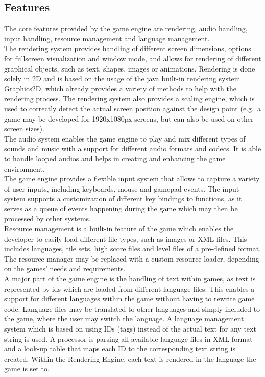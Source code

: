 \subsection{Features}\label{subsec:features}
The core features provided by the game engine are rendering, audio handling, input handling, resource management and language management.
\\
The rendering system provides handling of different screen dimensions, options for fullscreen visualization and window mode, and allows
for rendering of different graphical objects, such as text, shapes, images or animations.
Rendering is done solely in 2D and is based on the usage of the java built-in rendering system Graphics2D, which already provides a
variety of methods to help with the rendering process.
The rendering system also provides a scaling engine, which is used to correctly detect the actual screen position against the design point (e.g.\ a
game may be developed for 1920x1080px screens, but can also be used on other screen sizes).
\\
The audio system enables the game engine to play and mix different types of sounds and music with a support for different audio formats and codecs.
It is able to handle looped audios and helps in creating and enhancing the game environment.
\\
The game engine provides a flexible input system that allows to capture a variety of user inputs, including keyboards, mouse and gamepad events.
The input system supports a customization of different key bindings to functions, as it serves as a queue of events happening during the game which
may then be processed by other systems.
\\
Resource management is a built-in feature of the game which enables the developer to easily load different file types, such as images or XML files.
This includes languages, tile sets, high score files and level files of a pre-defined format.
The resource manager may be replaced with a custom resource loader, depending on the games' needs and requirements.
\\
A major part of the game engine is the handling of text within games, as text is represented by ids which are loaded from different language files.
This enables a support for different languages within the game without having to rewrite game code.
Language files may be translated to other languages and simply included to the game, where the user may switch the language.
A language management system which is based on using IDs (tags) instead of the actual text for any text string is used.
A processor is parsing all available language files in XML format and a look-up table that maps each ID to the corresponding text string is created.
Within the Rendering Engine, each text is rendered in the language the game is set to.


